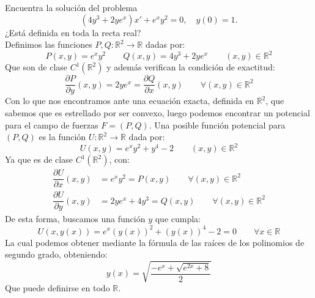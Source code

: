 \documentclass[12pt]{article}
\begin{document}
    \begin{ejercicio}
        Encuentra la solución del problema
        \begin{equation*}
            (4y^3+2ye^x)x'+e^xy^2=0,\quad y(0)=1.
        \end{equation*}
        ¿Está definida en toda la recta real?\\

        \noindent
        Definimos las funciones $P,Q:\mathbb{R}^2\rightarrow\mathbb{R}$ dadas por:
        \begin{equation*}
            P(x,y) = e^x y^2 \qquad Q(x,y) = 4y^3 + 2ye^x \qquad (x,y)\in \mathbb{R}^2
        \end{equation*}
        Que son de clase $C^1(\mathbb{R}^2)$ y además verifican la condición de exactitud:
        \begin{equation*}
            \dfrac{\partial P}{\partial y}(x,y) = 2ye^x = \dfrac{\partial Q}{\partial x}(x,y) \qquad \forall (x,y)\in \mathbb{R}^2
        \end{equation*}
        Con lo que nos encontramos ante una ecuación exacta, definida en $\mathbb{R}^2$, que sabemos que es estrellado por ser convexo, luego podemos encontrar un potencial para el campo de fuerzas $F=(P,Q)$. Una posible función potencial para $(P,Q)$ es la función $U:\mathbb{R}^2\rightarrow\mathbb{R}$ dada por:
        \begin{equation*}
            U(x,y) = e^xy^2 + y^4-2 \qquad (x,y)\in \mathbb{R}^2
        \end{equation*}
        Ya que es de clase $C^1(\mathbb{R}^2)$, con:
        \begin{align*}
            \dfrac{\partial U}{\partial x}(x,y) &= e^xy^2 = P(x,y) \qquad \forall (x,y)\in \mathbb{R}^2 \\
            \dfrac{\partial U}{\partial y}(x,y) &= 2ye^x + 4y^3 = Q(x,y) \qquad \forall (x,y)\in \mathbb{R}^2
        \end{align*}
        De esta forma, buscamos una función $y$ que cumpla:
        \begin{equation*}
            U(x,y(x)) = e^x {(y(x))}^{2} + {(y(x))}^{4}-2 = 0 \qquad \forall x\in \mathbb{R}
        \end{equation*}
        La cual podemos obtener mediante la fórmula de las raíces de los polinomios de segundo grado, obteniendo:
        \begin{equation*}
            y(x) = \sqrt{\dfrac{-e^x + \sqrt{e^{2x}+8}}{2}}
        \end{equation*}
        Que puede definirse en todo $\mathbb{R}$.
    \end{ejercicio}
\end{document}
